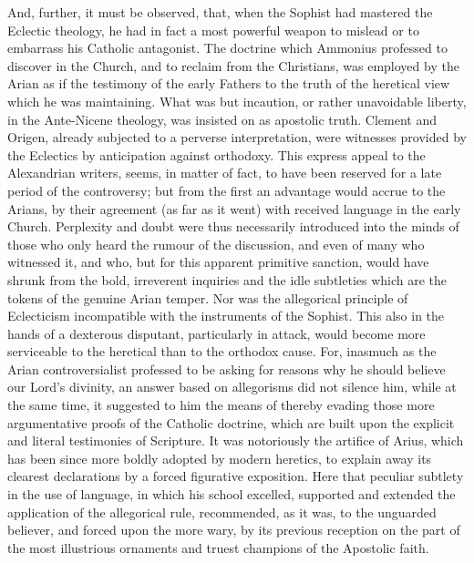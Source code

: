 And, further, it must be observed, that, when the Sophist had
mastered the Eclectic theology, he had in fact a most powerful weapon
to mislead or to embarrass his Catholic antagonist. The doctrine which
Ammonius professed to discover in the Church, and to reclaim from the
Christians, was employed by the Arian as if the testimony of the early
Fathers to the truth of the heretical view which he was maintaining.
What was but incaution, or rather unavoidable liberty, in the
Ante-Nicene theology, was insisted on as apostolic truth. Clement and
Origen, already subjected to a perverse interpretation, were witnesses
provided by the Eclectics by anticipation against orthodoxy. This
express appeal to the Alexandrian writers, seems, in matter of fact,
to have been reserved for a late period of the controversy; but from
the first an advantage would accrue to the Arians, by their agreement
(as far as it went) with received language in the early Church.
Perplexity and doubt were thus necessarily introduced into the minds
of those who only heard the rumour of the discussion, and even of many
who witnessed it, and who, but for this apparent primitive sanction,
would have shrunk from the bold, irreverent inquiries and the idle
subtleties which are the tokens of the genuine Arian temper. Nor
was the allegorical principle of Eclecticism incompatible with the
instruments of the Sophist. This also in the hands of a dexterous
disputant, particularly in attack, would become more serviceable to
the heretical than to the orthodox cause. For, inasmuch as the Arian
controversialist professed to be asking for reasons why he should
believe our Lord's divinity, an answer based on allegorisms did not
silence him, while at the same time, it suggested to him the means of
thereby evading those more argumentative proofs of the Catholic
doctrine, which are built upon the explicit and literal testimonies of
Scripture. It was notoriously the artifice of Arius, which has been
since more boldly adopted by modern heretics, to explain away its
clearest declarations by a forced figurative exposition. Here that
peculiar subtlety in the use of language, in which his school
excelled, supported and extended the application of the allegorical
rule, recommended, as it was, to the unguarded believer, and forced
upon the more wary, by its previous reception on the part of the most
illustrious ornaments and truest champions of the Apostolic faith.

